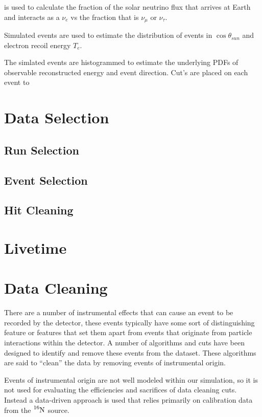 is used to calculate the fraction of the solar neutrino flux that arrives
at Earth and interacts as a $\nu_{e}$ vs the fraction that is $\nu_{\mu}$ or $\nu_{\tau}$.

Simulated events are used to estimate the distribution of events in $\cos\theta_{sun}$ and
electron recoil energy $T_{e}$.

The simlated events are histogrammed to estimate the underlying PDFs
of observable reconstructed energy and event direction. Cut's are placed
on each event to
\section{Data Selection}
\subsection{Run Selection}
\subsection{Event Selection}

\subsection{Hit Cleaning}

\section{Livetime}
\section{Data Cleaning}
There are a number of instrumental effects that can cause an event
to be recorded by the detector, these events typically have some
sort of distinguishing feature or features that set them apart
from events that originate from particle interactions within the
detector.
A number of algorithms and cuts have been designed to identify and remove
these events from the dataset.
These algorithms are said to ``clean'' the data by removing events
of instrumental origin.

Events of instrumental origin are not well modeled within our simulation,
so it is not used for evaluating the efficiencies and sacrifices of
data cleaning cuts.
Instead a data-driven approach is used that relies primarily on calibration
data from the $\ce{^{16}N}$ source.

